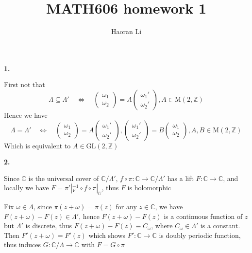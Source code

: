 \documentclass{article}
\title{MATH606 homework 1}
\author{Haoran Li}
\date{}
\begin{document}
\maketitle

\textbf{1.} \par
First not that
\[
\Lambda \subseteq \Lambda' \quad \Leftrightarrow \quad 
\begin{pmatrix}
\omega_{1}\\ 
\omega_{2}
\end{pmatrix}
=A
\begin{pmatrix}
\omega_{1}'\\ 
\omega_{2}'
\end{pmatrix}
,A \in \mathrm{M}(2,\mathbb{Z})
\]
Hence we have
\[
\Lambda = \Lambda' \quad \Leftrightarrow \quad 
\begin{pmatrix}
\omega_{1}\\ 
\omega_{2}
\end{pmatrix}
=A
\begin{pmatrix}
\omega_{1}'\\ 
\omega_{2}'
\end{pmatrix}
,
\begin{pmatrix}
\omega_{1}'\\ 
\omega_{2}'
\end{pmatrix}
=B
\begin{pmatrix}
\omega_{1}\\ 
\omega_{2}
\end{pmatrix}
,A,B \in \mathrm{M}(2,\mathbb{Z})
\]
Which is equivalent to \(A\in \mathrm{GL}(2,\mathbb{Z})\)

\textbf{2.} \par
Since $\mathbb{C}$ is the universal cover of \(\mathbb{C}/\Lambda'\), $f\circ\pi:\mathbb{C}\rightarrow \mathbb{C}/\Lambda'$ has a lift $F:\mathbb{C}\rightarrow \mathbb{C}$, and locally we have $F=\pi'|_{V}^{-1}\circ f\circ\pi|_{U}$, thus $F$ is holomorphic

\begin{center}
\end{center}

Fix \(\omega\in \Lambda\), since $\pi(z+\omega)=\pi(z)$ for any $z\in \mathbb{C}$, we have $F(z+\omega)-F(z)\in\Lambda'$, hence  \(F(z+\omega)-F(z)\) is a continuous function of $z$ but $\Lambda'$ is discrete, thus $F(z+\omega)-F(z)\equiv C_{\omega}$, where $C_{\omega}\in\Lambda'$ is a constant. Then $F'(z+\omega)=F'(z)$ which shows $F':\mathbb{C}\rightarrow \mathbb{C}$ is doubly periodic function, thus induces $G:\mathbb{C}/\Lambda\rightarrow \mathbb{C}$ with $F=G\circ\pi$
\end{document}
